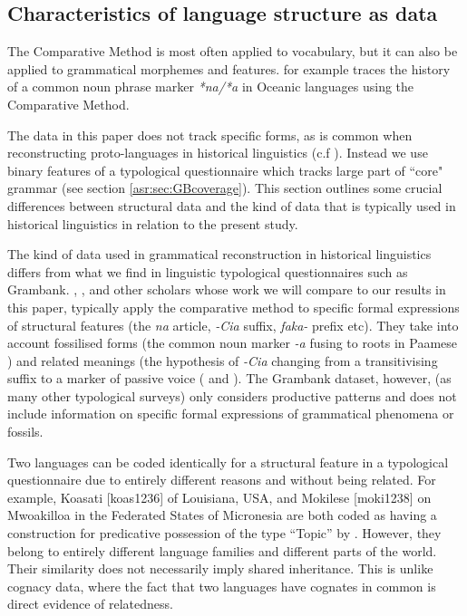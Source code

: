 \documentclass[draft,10pt]{article} %
\begin{document}


\subsection{Characteristics of language structure as data}
\label{diff_lexi_str}

The Comparative Method is most often applied to vocabulary, but it can also be applied to grammatical morphemes and features. \citet{crowley1985common} for example traces the history of a common noun phrase marker \emph{*na/*a} in Oceanic languages using the Comparative Method. 

The data in this paper does not track specific forms, as is common when reconstructing proto-languages in historical linguistics (c.f \citet{pawley1973some, crowley1985common, evans2003study}). Instead we use binary features of a typological questionnaire which tracks large part of ``core" grammar (see section \ref{asr:sec:GBcoverage}). This section outlines some crucial differences between structural data and the kind of data that is typically used in historical linguistics in relation to the present study.

The kind of data used in grammatical reconstruction in historical linguistics differs from what we find in linguistic typological questionnaires such as Grambank. \citet{crowley1985common}, \citet{clark1976aspects}, and other scholars whose work we will compare to our results in this paper, typically apply the comparative method to specific formal expressions of structural features (the \emph{na} article, \emph{-Cia} suffix, \emph{faka-} prefix etc). They take into account fossilised forms (the common noun marker \emph{-a} fusing to roots in Paamese \citep[141]{crowley1985common}) and related meanings (the hypothesis of \emph{-Cia} changing from a transitivising suffix to a marker of passive voice (\citet{hale_1968, hohepa_1967, hohepa_1969, chung1978} and \citet{jonsson1998}). The Grambank dataset, however, (as many other typological surveys) only considers productive patterns and does not include information on specific formal expressions of grammatical phenomena or fossils.

Two languages can be coded identically for a structural feature in a typological questionnaire due to entirely different reasons and without being related. For example, Koasati [koas1236] of Louisiana, USA, and Mokilese [moki1238] on Mwoakilloa in the Federated States of Micronesia are both coded as having a construction for predicative possession of the type ``Topic'' by \citet{wals-2011-117}. However, they belong to entirely different language families and different parts of the world. Their similarity does not necessarily imply shared inheritance. This is unlike cognacy data, where the fact that two languages have cognates in common is direct evidence of relatedness.
\end{document}
